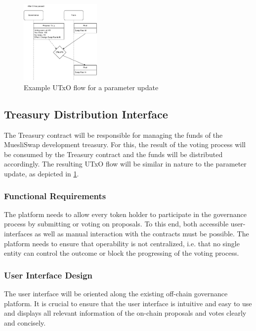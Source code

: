 \documentclass[11pt]{article}
\begin{document}
\begin{figure}
    \centering
    \includegraphics[width=0.35\textwidth]{figures/userflow-contracts-4.pdf}
    \caption{Example UTxO flow for a parameter update}
    \label{fig:utxo-flow-params}
\end{figure}

\subsection{Treasury Distribution Interface}

The Treasury contract will be responsible for managing the funds of the MuesliSwap development treasury.
For this, the result of the voting process will be consumed by the Treasury contract and the funds will be distributed accordingly.
The resulting UTxO flow will be similar in nature to the parameter update, as depicted in \cref{fig:utxo-flow-params}.

\subsubsection{Functional Requirements}

The platform needs to allow every token holder to participate in the governance process by submitting or voting on proposals.
To this end, both accessible user-interfaces as well as manual interaction with the contracts must be possible.
The platform needs to ensure that operability is not centralized, i.e. that no single entity can control the outcome or block the progressing of the voting process.

\subsubsection{User Interface Design}
The user interface will be oriented along the existing off-chain governance platform.
It is crucial to ensure that the user interface is intuitive and easy to use and displays all relevant information
of the on-chain proposals and votes clearly and concisely.
\end{document}
